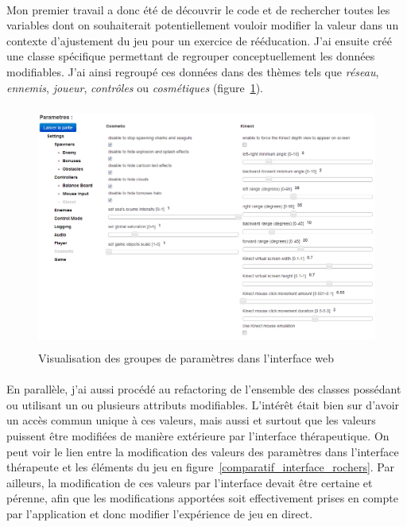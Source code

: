 \paragraph{}
Mon premier travail a donc été de découvrir le code et de rechercher toutes les variables dont on souhaiterait potentiellement vouloir modifier la valeur dans un contexte d'ajustement du jeu pour un exercice de rééducation. J'ai ensuite créé une classe spécifique permettant de regrouper conceptuellement les données modifiables. J'ai ainsi regroupé ces données dans des thèmes tels que \emph{réseau}, \emph{ennemis}, \emph{joueur}, \emph{contrôles} ou \emph{cosmétiques} (figure~\ref{ensemble_parametres}).
\begin{figure}[!hbtp]
	\centering
	\includegraphics[width=14cm, height=8cm]{images/ensemble_parametres.png}
	\caption{Visualisation des groupes de paramètres dans l'interface web}
	\label{ensemble_parametres}
\end{figure}

\paragraph{}
En parallèle, j'ai aussi procédé au refactoring de l'ensemble des classes possédant ou utilisant un ou plusieurs attributs modifiables. L'intérêt était bien sur d'avoir un accès commun unique à ces valeurs, mais aussi et surtout que les valeurs puissent être modifiées de manière extérieure par l'interface thérapeutique. On peut voir le lien entre la modification des valeurs des paramètres dans l'interface thérapeute et les éléments du jeu en figure~\ref{comparatif_interface_rochers}. Par ailleurs, la modification de ces valeurs par l'interface devait être certaine et pérenne, afin que les modifications apportées soit effectivement prises en compte par l'application et donc modifier l'expérience de jeu en direct.

